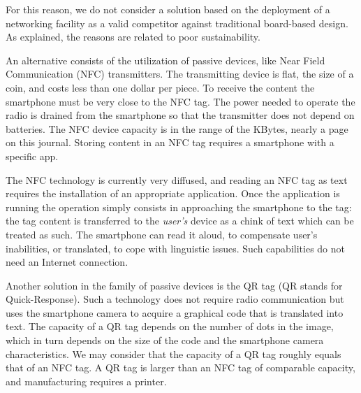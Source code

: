 \documentclass[sustainability,article,submit,pdftex,moreauthors]{Definitions/mdpi}
\begin{document}
For this reason, we do not consider a solution based on the deployment of a networking facility as a valid competitor against traditional board-based design. As explained, the reasons are related to poor sustainability.

An alternative consists of the utilization of passive devices, like Near Field Communication (NFC) transmitters. The transmitting device is flat, the size of a coin, and costs less than one dollar per piece. To receive the content the smartphone must be very close to the NFC tag. The power needed to operate the radio is drained from the smartphone so that the transmitter does not depend on batteries. The NFC device capacity is in the range of the KBytes, nearly a page on this journal. Storing content in an NFC tag requires a smartphone with a specific app.

The NFC technology is currently very diffused, and reading an NFC tag as text requires the installation of an appropriate application. Once the application is running the operation simply consists in approaching the smartphone to the tag: the tag content is transferred to the {\em user's} device as a chink of text which can be treated as such. The smartphone can read it aloud, to compensate user's inabilities, or translated, to cope with linguistic issues. Such capabilities do not need an Internet connection.

Another solution in the family of passive devices is the QR tag (QR stands for Quick-Response). Such a technology does not require radio communication but uses the smartphone camera to acquire a graphical code that is translated into text. The capacity of a QR tag depends on the number of dots in the image, which in turn depends on the size of the code and the smartphone camera characteristics. We may consider that the capacity of a QR tag roughly equals that of an NFC tag. A QR tag is larger than an NFC tag of comparable capacity, and manufacturing requires a printer.
\end{document}
